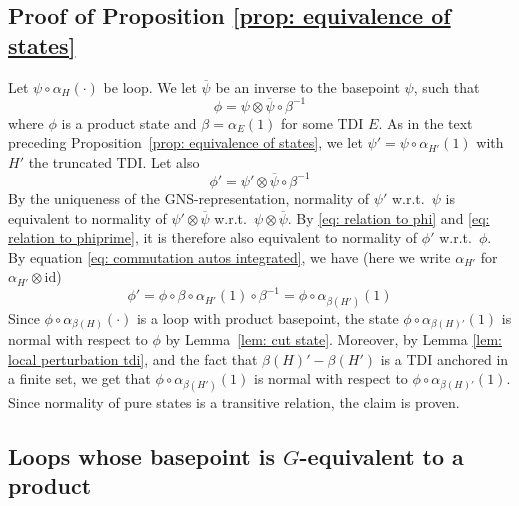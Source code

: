 \subsection{Proof of Proposition \ref{prop: equivalence of states}} \label{sec: proof of equivalence propo}
Let $\psi\circ\alpha_H(\cdot)$ be loop. We let $\overline{\psi}$ be an inverse to the basepoint $\psi$, such that
\begin{equation} \label{eq: relation to phi}
	\phi=\psi \otimes \overline{\psi} \circ \beta^{-1}
\end{equation}
where $\phi$ is a product state and $\beta=\alpha_{E}(1)$ for some TDI $E$.  As in the text preceding Proposition~\ref{prop: equivalence of states}, we let $\psi'=\psi \circ \alpha_{H'}(1)$ with $H'$ the truncated TDI. Let also
\begin{equation} \label{eq: relation to phiprime}
	\phi'= \psi' \otimes \overline{\psi} \circ \beta^{-1}
\end{equation}
By the uniqueness of the GNS-representation, normality of $\psi'$ w.r.t.\ $\psi$ is equivalent to normality of $\psi'\otimes\overline{\psi}$ w.r.t.\  $\psi\otimes\overline{\psi}$. By \eqref{eq: relation to phi} and \eqref{eq: relation to phiprime}, it is therefore also equivalent to normality of $\phi'$ w.r.t.\  $\phi$. By equation \eqref{eq: commutation autos integrated}, we have (here we write $\alpha_{H'}$ for $\alpha_{H'}\otimes \mathrm{id}$)
$$
\phi'= \phi  \circ \beta \circ \alpha_{H'}(1) \circ \beta^{-1} =   \phi  \circ \alpha_{\beta(H')}(1)   
$$
Since $\phi  \circ \alpha_{\beta(H)}(\cdot)$ is a loop with product basepoint, the state $\phi  \circ \alpha_{\beta(H)'}(1)$ is normal with respect to $\phi$ by Lemma~\ref{lem: cut state}.  
Moreover, by Lemma \ref{lem: local perturbation tdi}, and the fact that $\beta(H)'-\beta(H')$ is a TDI anchored in a finite set, we get that 
$\phi  \circ \alpha_{\beta(H')}(1) $  is normal with respect to $\phi  \circ \alpha_{\beta(H)'}(1) $.
Since normality of pure states is a transitive relation, the claim is proven. 



\subsection{Loops whose basepoint is $G$-equivalent to a product}\label{sec: loops with equivalent base}

